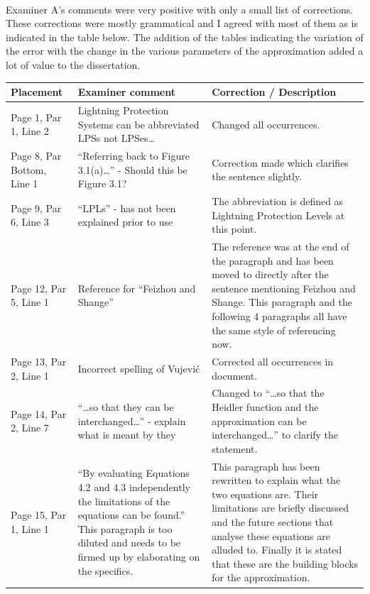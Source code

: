 \documentclass[11pt,a4paper]{letter} %
\begin{document}
\newpage

\\

Examiner A's comments were very positive with only a small list of corrections. These corrections were mostly grammatical and I agreed with most of them as is indicated in the table below. The addition of the tables indicating the variation of the error with the change in the various parameters of the approximation added a lot of value to the dissertation.

\begin{tabularx}{6.5in}{X|p{}|p{}}
	\textbf{Placement} & \textbf{Examiner comment} & \textbf{Correction / Description} \\ \hline
	\endhead
	Page 1, Par 1, Line 2 & Lightning Protection Systems can be abbreviated LPSs not LPSes\ldots & Changed all occurrences.  \\ \hline
	Page 8, Par Bottom, Line 1 & ``Referring back to Figure 3.1(a)\ldots'' - Should this be Figure 3.1?  & Correction made which clarifies the sentence slightly. \\ \hline
	Page 9, Par 6, Line 3 & ``LPLs'' - has not been explained prior to use & The abbreviation is defined as Lightning Protection Levels at this point. \\ \hline
	Page 12, Par 5, Line 1 & Reference for ``Feizhou and Shange'' & The reference was at the end of the paragraph and has been moved to directly after the sentence mentioning Feizhou and Shange. This paragraph and the following 4 paragraphs all have the same style of referencing now. \\ \hline
	Page 13, Par 2, Line 1 & Incorrect spelling of Vujevi\'{c} & Corrected all occurrences in document. \\ \hline
	Page 14, Par 2, Line 7 & ``\ldots so that they can be interchanged\ldots'' - explain what is meant by they & Changed to ``\ldots so that the Heidler function and the approximation can be interchanged\ldots'' to clarify the statement. \\ \hline
	Page 15, Par 1, Line 1 & ``By evaluating Equations 4.2 and 4.3 independently the limitations of the equations can be found.'' This paragraph is too diluted and needs to be firmed up by elaborating on the specifics. & This paragraph has been rewritten to explain what the two equations are. Their limitations are briefly discussed and the future sections that analyse these equations are alluded to. Finally it is stated that these are the building blocks for the approximation. \\ \hline

\end{tabularx}
\end{document}
